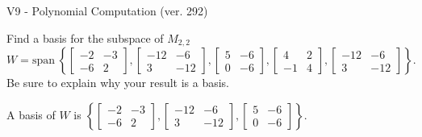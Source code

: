 \begin{exercise}
  \begin{exerciseTitle}V9 - Polynomial Computation (ver. 292)\end{exerciseTitle}
  \begin{exerciseStatement}
    Find a basis for the subspace of \(M_{2,2}\) 
\[W=\mathrm{span}\ \left\{\left[\begin{array}{cc}
-2 & -3 \\
-6 & 2
\end{array}\right] , \left[\begin{array}{cc}
-12 & -6 \\
3 & -12
\end{array}\right] , \left[\begin{array}{cc}
5 & -6 \\
0 & -6
\end{array}\right] , \left[\begin{array}{cc}
4 & 2 \\
-1 & 4
\end{array}\right] , \left[\begin{array}{cc}
-12 & -6 \\
3 & -12
\end{array}\right]\right\}.\]
 Be sure to explain why your result is a basis.


  \end{exerciseStatement}
  \begin{exerciseAnswer}
   A basis of \(W\) is  \(\left\{\left[\begin{array}{cc}
-2 & -3 \\
-6 & 2
\end{array}\right] , \left[\begin{array}{cc}
-12 & -6 \\
3 & -12
\end{array}\right] , \left[\begin{array}{cc}
5 & -6 \\
0 & -6
\end{array}\right]\right\}\).
  


  \end{exerciseAnswer}
\end{exercise}